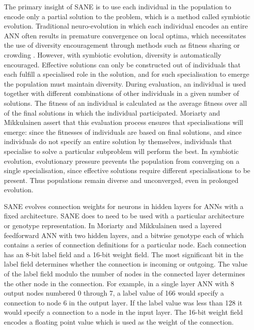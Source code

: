 \documentclass[12pt]{article} %
\begin{document}
The primary insight of SANE \cite{Moriarty1996} is to use each individual in the population to encode only a partial solution to the problem, which is a method called symbiotic evolution. Traditional neuro-evolution in which each individual encodes an entire ANN often results in premature convergence on local optima, which necessitates the use of diversity encouragement through methods such as fitness sharing \cite{Goldberg1987}\cite{Sareni1998} or crowding \cite{Sareni1998}. However, with symbiotic evolution, diversity is automatically encouraged. Effective solutions can only be constructed out of individuals that each fulfill a specialised role in the solution, and for such specialisation to emerge the population must maintain diversity. During evaluation, an individual is used together with different combinations of other individuals in a given number of solutions. The fitness of an individual is calculated as the average fitness over all of the final solutions in which the individual participated. Moriarty and Mikkulainen assert that this evaluation process ensures that specialisations will emerge: since the fitnesses of individuals are based on final solutions, and since individuals do not specify an entire solution by themselves, individuals that specialise to solve a particular subproblem will perform the best. In symbiotic evolution, evolutionary pressure prevents the population from converging on a single specialisation, since effective solutions require different specialisations to be present. Thus populations remain diverse and unconverged, even in prolonged evolution.

SANE evolves connection weights for neurons in hidden layers for ANNs with a fixed architecture. SANE does to need to be used with a particular architecture or genotype representation. In \cite{Moriarty1996} Moriarty and Mikkulainen used a layered feedforward ANN with two hidden layers, and a bitwise genotype each of which contains a series of connection definitions for a particular node. Each connection has an 8-bit label field and a 16-bit weight field. The most significant bit in the label field determines whether the connection is incoming or outgoing. The value of the label field modulo the number of nodes in the connected layer determines the other node in the connection. For example, in a single layer ANN with 8 output nodes numbered 0 through 7, a label value of 166 would specify a connection to node 6 in the output layer. If the label value was less than 128 it would specify a connection to a node in the input layer. The 16-bit weight field encodes a floating point value which is used as the weight of the connection.
\end{document}
